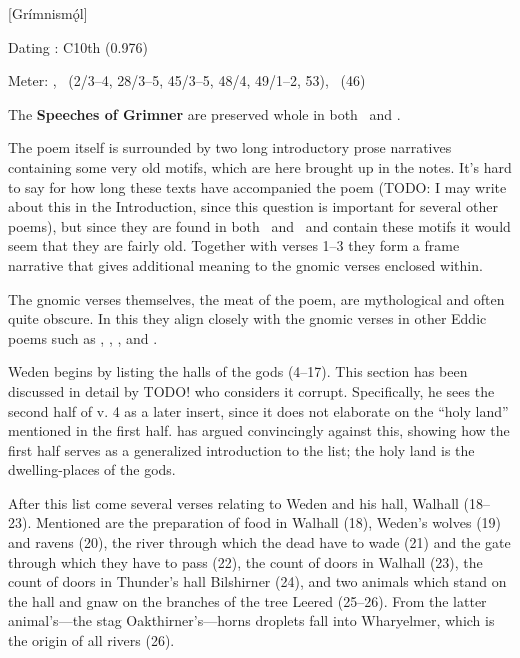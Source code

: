 [Grímnismǫ́l]

\begin{flushright}%
Dating \parencite{Sapp2022}: C10th (0.976)

Meter: \Ljodahattr, \Fornyrdislag\ (2/3–4, 28/3–5, 45/3–5, 48/4, 49/1–2, 53), \Galdralag\ (46)%
\end{flushright}


The \textbf{Speeches of Grimner} are preserved whole in both \Regius\ and \AM.

The poem itself is surrounded by two long introductory prose narratives containing some very old motifs, which are here brought up in the notes. It’s hard to say for how long these texts have accompanied the poem (TODO: I may write about this in the Introduction, since this question is important for several other poems), but since they are found in both \Regius\ and \AM\ and contain these motifs it would seem that they are fairly old. Together with verses 1–3 they form a frame narrative that gives additional meaning to the gnomic verses enclosed within.

The gnomic verses themselves, the meat of the poem, are mythological and often quite obscure. In this they align closely with the gnomic verses in other Eddic poems such as \Havamal, \Vafthrudnismal, \Sigrdrifumal, and \Allvismal.

Weden begins by listing the halls of the gods (4–17). This section has been discussed in detail by \textcite{deVries1952} TODO! who considers it corrupt. Specifically, he sees the second half of v. 4 as a later insert, since it does not elaborate on the “holy land” mentioned in the first half. \textcite{Jackson1995} has argued convincingly against this, showing how the first half serves as a generalized introduction to the list; the holy land is the dwelling-places of the gods.

After this list come several verses relating to Weden and his hall, Walhall (18–23). Mentioned are the preparation of food in Walhall (18), Weden’s wolves (19) and ravens (20), the river through which the dead have to wade (21) and the gate through which they have to pass (22), the count of doors in Walhall (23), the count of doors in Thunder’s hall Bilshirner (24), and two animals which stand on the hall and gnaw on the branches of the tree Leered (25–26). From the latter animal’s—the stag Oakthirner’s—horns droplets fall into Wharyelmer, which is the origin of all rivers (26).

